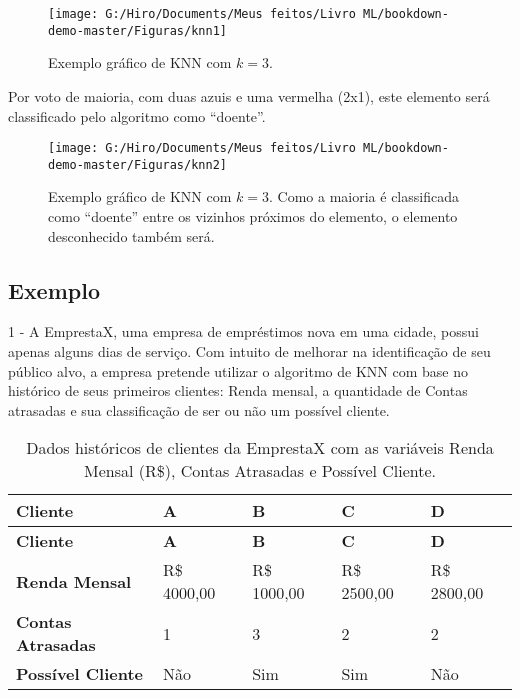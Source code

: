 \documentclass[
  openany]{book}
\begin{document}
\begin{figure}

{\centering \texttt{[image: G:/Hiro/Documents/Meus feitos/Livro ML/bookdown-demo-master/Figuras/knn1]} 

}

\caption{Exemplo gráfico de KNN com \(k=3\).}\label{fig:knn1}
\end{figure}



Por voto de maioria, com duas azuis e uma vermelha (2x1), este elemento será classificado pelo algoritmo como ``doente''.

\begin{figure}

{\centering \texttt{[image: G:/Hiro/Documents/Meus feitos/Livro ML/bookdown-demo-master/Figuras/knn2]} 

}

\caption{Exemplo gráfico de KNN com \(k=3\). Como a maioria é classificada como ``doente'' entre os vizinhos próximos do elemento, o elemento desconhecido também será.}\label{fig:knn2}
\end{figure}



\hypertarget{exknn}{%
\subsection{Exemplo}\label{exknn}}

1 - A EmprestaX, uma empresa de empréstimos nova em uma cidade, possui apenas alguns dias de serviço. Com intuito de melhorar na identificação de seu público alvo, a empresa pretende utilizar o algoritmo de KNN com base no histórico de seus primeiros clientes: Renda mensal, a quantidade de Contas atrasadas e sua classificação de ser ou não um possível cliente.

\begin{longtable}[]{@{}lllll@{}}
\caption{\label{tab:dadossrendaaknn} Dados históricos de clientes da EmprestaX com as variáveis Renda Mensal (R\$), Contas Atrasadas e Possível Cliente.}\tabularnewline
\toprule
\textbf{Cliente} & \textbf{A} & \textbf{B} & \textbf{C} & \textbf{D}\tabularnewline
\midrule
\endfirsthead
\toprule
\textbf{Cliente} & \textbf{A} & \textbf{B} & \textbf{C} & \textbf{D}\tabularnewline
\midrule
\endhead
\textbf{Renda Mensal} & R\$ 4000,00 & R\$ 1000,00 & R\$ 2500,00 & R\$ 2800,00\tabularnewline
\textbf{Contas Atrasadas} & 1 & 3 & 2 & 2\tabularnewline
\textbf{Possível Cliente} & Não & Sim & Sim & Não\tabularnewline
\bottomrule
\end{longtable}
\end{document}
